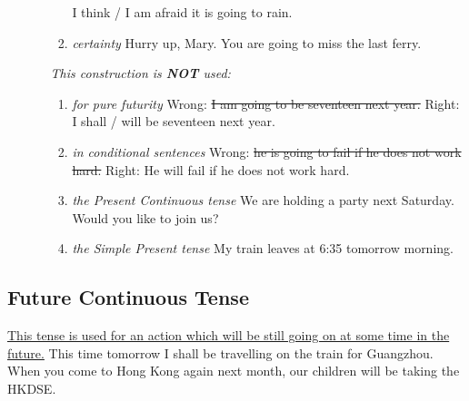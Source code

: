 \begin{enumerate}
\begin{enumerate}
\begin{enumerate}
                        I think / I am afraid it is going to rain.
                    \item {\it certainty}
                        \newline
                        \newline
                        Hurry up, Mary. You are going to miss the last ferry.
                \end{enumerate}
                {\it This construction is {\bf NOT} used:}
                \begin{enumerate}
                    \item {\it for pure futurity}
                        \newline
                        \newline
                        Wrong: \st{I am going to be seventeen next year.}
                        \newline
                        \newline
                        Right: I shall / will be seventeen next year.
                    \item {\it in conditional sentences}
                        \newline
                        \newline
                        Wrong: \st{he is going to fail if he does not work
                        hard.}
                        \newline
                        Right: He will fail if he does not work hard.
                    \item {\it the Present Continuous tense}
                        \newline
                        \newline
                        We are holding a party next Saturday. Would you like to
                        join us?
                    \item {\it the Simple Present tense}
                        \newline
                        \newline
                        My train leaves at 6:35 tomorrow morning.
                \end{enumerate}
        \end{enumerate}
\end{enumerate}

\newpage
\subsection{Future Continuous Tense}
\underline{This tense is used for an action which will be still going on at some
time in the future.}
\newline
\newline
This time tomorrow I shall be travelling on the train for Guangzhou.
\newline
When you come to Hong Kong again next month, our children will be taking the
HKDSE.

